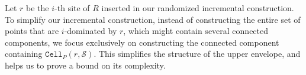 \documentclass[a4paper, 11pt]{article}
\newcommand{\icell}[1][i]{${#1}$-patch\xspace}
\newcommand{\icells}[1][i]{${#1}$-patches\xspace}
\newcommand{\idom}[1][i]{${#1}$-dominated\xspace}
\newcommand{\s}{\mathcal S}
\newcommand{\dd}[3][P]{\ensuremath{\textsc{d}_{\scriptscriptstyle w}^{\scriptscriptstyle #1}(#2 {\leadsto} #3)}}
\newcommand{\funnel}[2][P]{\ensuremath{\mathtt{Funnel}_{\scriptscriptstyle #1}(#2)}}
\newcommand{\cell}[2][P]{\ensuremath{\mathtt{Cell}_{\scriptscriptstyle #1}(#2)}}
\begin{document}
%
%





Let $r$ be the $i$-th site of $R$ inserted in our randomized incremental construction. 
To simplify our incremental construction, instead of constructing the entire set of points that are \idom by $r$, which might contain several connected components,
we focus exclusively on constructing the connected component containing $\cell{r, \s}$.
This simplifies the structure of the upper envelope, and helps us to prove a bound on its complexity. 
\end{document}
